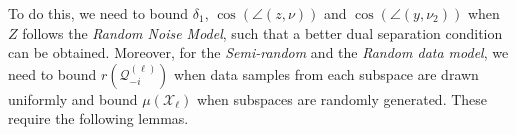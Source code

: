 \documentclass[twoside,11pt]{article}
\numberwithin{equation}{section}
\begin{document}
To do this, we need to bound $\delta_1$, $\cos(\angle(z,\nu))$ and $\cos(\angle(y,\nu_2))$ when $Z$ follows the \emph{Random Noise Model}, such that a better dual separation condition can be obtained. Moreover, for the \emph{Semi-random} and the \emph{Random data model}, we need to bound $r(\mathcal{Q}^{(\ell)}_{-i})$ when data samples from each subspace are drawn uniformly and bound $\mu(\mathcal{X}_{\ell})$  when subspaces are randomly generated.
These require the following lemmas.
\end{document}

